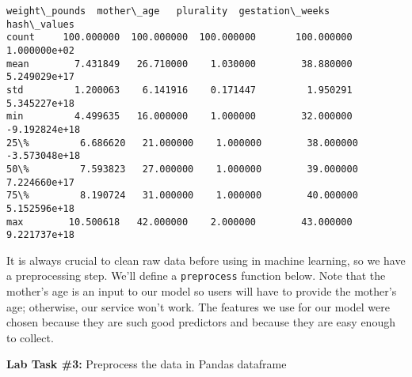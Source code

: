 \documentclass[11pt]{article}
\makeatletter
\newcommand{\boxspacing}{\kern\kvtcb@left@rule\kern\kvtcb@boxsep}
\newcommand{\prompt}[4]{
        \ttfamily\llap{{\color{#2}[#3]:\hspace{3pt}#4}}\vspace{-\baselineskip}
    }
\makeatother
\begin{document}
            \begin{tcolorbox}[breakable, size=fbox, boxrule=.5pt, pad at break*=1mm, opacityfill=0]
\prompt{Out}{outcolor}{45}{\boxspacing}
\begin{Verbatim}[commandchars=\\\{\}]
       weight\_pounds  mother\_age   plurality  gestation\_weeks   hash\_values
count     100.000000  100.000000  100.000000       100.000000  1.000000e+02
mean        7.431849   26.710000    1.030000        38.880000  5.249029e+17
std         1.200063    6.141916    0.171447         1.950291  5.345227e+18
min         4.499635   16.000000    1.000000        32.000000 -9.192824e+18
25\%         6.686620   21.000000    1.000000        38.000000 -3.573048e+18
50\%         7.593823   27.000000    1.000000        39.000000  7.224660e+17
75\%         8.190724   31.000000    1.000000        40.000000  5.152596e+18
max        10.500618   42.000000    2.000000        43.000000  9.221737e+18
\end{Verbatim}
\end{tcolorbox}
        
    It is always crucial to clean raw data before using in machine learning,
so we have a preprocessing step. We'll define a \texttt{preprocess}
function below. Note that the mother's age is an input to our model so
users will have to provide the mother's age; otherwise, our service
won't work. The features we use for our model were chosen because they
are such good predictors and because they are easy enough to collect.

    \textbf{Lab Task \#3:} Preprocess the data in Pandas dataframe
\end{document}
